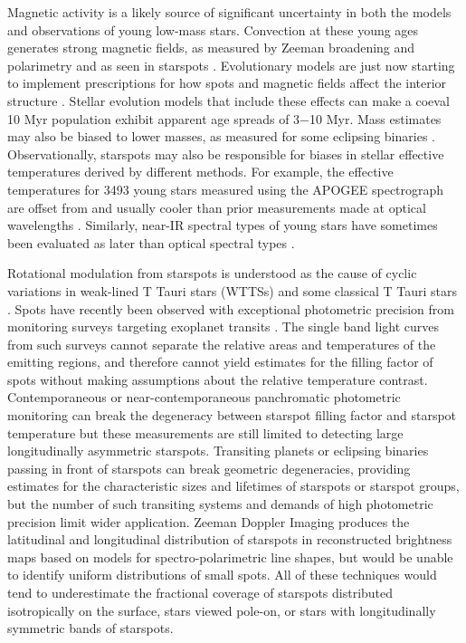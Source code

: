 \documentclass[twocolumn]{emulateapj}%
\begin{document}
Magnetic activity is a likely source of significant uncertainty in both the models and observations of young low-mass stars. Convection at these young ages generates strong magnetic fields, as measured by Zeeman broadening and polarimetry \citep[e.g.][]{johnskrull07,donati09} and as seen in starspots \citep[e.g.][]{stauffer03,grankin08}.  Evolutionary models are just now starting to implement prescriptions for how spots and magnetic fields affect the interior structure \citep{macdonald13,jackson14a,somers15,feiden16}.  Stellar evolution models that include these effects can make a coeval 10 Myr population exhibit apparent age spreads of 3$-$10 Myr.  Mass estimates may also be biased to lower masses, as measured for some eclipsing binaries \citep[e.g.][]{stassun14,rizzuto16}.   Observationally, starspots may also be responsible for biases in stellar effective temperatures derived by different methods.  For example, the effective temperatures for 3493 young stars measured using the APOGEE spectrograph \citep[$1.5-1.70 \;\mu$m at $R=22,500$][]{wilson10} are offset from and usually cooler than prior measurements made at optical wavelengths \citep{cottaar14}.  Similarly, near-IR spectral types of young stars have sometimes been evaluated as later than optical spectral types \citep{bouvier92,vacca11}.


Rotational modulation from starspots is understood as the cause of cyclic variations in weak-lined T Tauri stars (WTTSs) and some classical T Tauri stars \citep[e.g.][]{vrba86,herbst94}.  Spots have recently been observed with exceptional photometric precision from monitoring surveys targeting exoplanet transits \citep[\emph{e.g}][]{harrison11,davenport15}.  The single band light curves from such surveys cannot separate the relative areas and temperatures of the emitting regions, and therefore cannot yield estimates for the filling factor of spots without making assumptions about the relative temperature contrast. Contemporaneous or near-contemporaneous panchromatic photometric monitoring \citep{herbst94,petrov94,bouvier95,grankin07,cody14} can break the degeneracy between starspot filling factor and starspot temperature but these measurements are still limited to detecting large longitudinally asymmetric starspots.  Transiting planets or eclipsing binaries passing in front of starspots \citep{desert11} can break geometric degeneracies, providing estimates for the characteristic sizes and lifetimes of starspots or starspot groups, but the number of such transiting systems and demands of high photometric precision limit wider application.  Zeeman Doppler Imaging \citep[ZDI]{donati14} produces the latitudinal and longitudinal distribution of starspots in reconstructed brightness maps based on models for spectro-polarimetric line shapes, but would be unable to identify uniform distributions of small spots.  All of these techniques would tend to underestimate the fractional coverage of starspots distributed isotropically on the surface, stars viewed pole-on, or stars with longitudinally symmetric bands of starspots.
\end{document}
